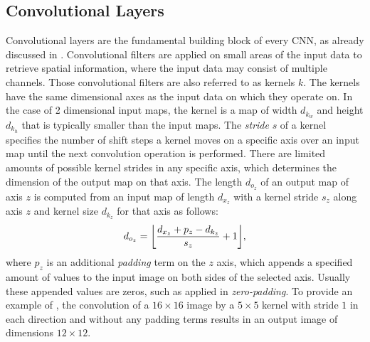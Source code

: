 
\subsection{Convolutional Layers}\label{sec:nn_theory_cnn}
Convolutional layers are the fundamental building block of every CNN, as already discussed in .
Convolutional filters are applied on small areas of the input data to retrieve spatial information, where the input data may consist of multiple channels.
Those convolutional filters are also referred to as kernels $k$.
The kernels have the same dimensional axes as the input data on which they operate on.
In the case of 2 dimensional input maps, the kernel is a map of width $d_{k_w}$ and height $d_{k_h}$ that is typically smaller than the input maps.
The \emph{stride} $s$ of a kernel specifies the number of shift steps a kernel moves on a specific axis over an input map until the next convolution operation is performed.
There are limited amounts of possible kernel strides in any specific axis, which determines the dimension of the output map on that axis.
The length $d_{o_z}$ of an output map of axis $z$ is computed from an input map of length $d_{x_z}$ with a kernel stride $s_z$ along axis $z$ and kernel size $d_{k_z}$ for that axis as follows:
\begin{equation}\label{eq:nn_theory_cnn_dim}
  d_{o_z} = \floor*{\frac{d_{x_z} + p_z - d_{k_z}}{s_z} + 1},
\end{equation}
where $p_z$ is an additional \emph{padding} term on the $z$ axis, which appends a specified amount of values to the input image on both sides of the selected axis.
Usually these appended values are zeros, such as applied in \emph{zero-padding}.
To provide an example of , the convolution of a $16 \times 16$ image by a $5 \times 5$ kernel with stride $1$ in each direction and without any padding terms results in an output image of dimensions $12 \times 12$.

